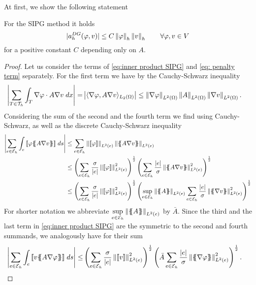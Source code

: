 At first, we show the following statement
\begin{lemma}\label{la: SIPG continuous}
	For the SIPG method it holds
	\[
	|a_h^{DG}(\varphi, v) | \leq C \left\lVert \varphi \right\rVert_{h} \left\lVert v \right\rVert_{h} \qquad \forall \varphi,v \in V
	\]
	for a positive constant $C$ depending only on $A$.
\end{lemma}
\begin{proof}
	Let us consider the terms of \eqref{eq:inner product SIPG} and \eqref{eq: penalty term} separately.
	For the first term we have by the Cauchy-Schwarz inequality
	\begin{align}
	\left| \sum\limits_{T \in \mathcal{T}_h} \int_{T} {{ \nabla \varphi \cdot A \nabla v}\;dx} \right|
	 =& \left|   \langle \nabla \varphi, A\nabla v \rangle _{L_2(\Omega)}  \right|
	  \leq \left\lVert \nabla \varphi \right\rVert_{L^2(\Omega)} \left\lVert A \right\rVert_{L^2(\Omega)} \left\lVert \nabla v \right\rVert_{L^2(\Omega)}. \label{eq: CS estimate 0}
	\end{align}
	Considering the sum of the second and the fourth term we find using Cauchy-Schwarz, as well as the discrete Cauchy-Schwarz inequality
	\begin{align}
	\singleNorm{\sum\limits_{e \in \edges}\myIntS e { \jump {\varphi \average{A \nabla v} }}} &\leq
	\sum\limits_{e \in \edges}  \LTwonormE{\jump {\varphi}} \LTwonormE {\average{A \nabla v}} \nonumber \\
	& \leq
	\left( \sum\limits_{e \in \edges} \frac {\sigma}{|e|} \LTwonormE{\jump {\varphi}}^2 \right)^{\frac 1 2}
	\left( \sum\limits_{e \in \edges} \frac {|e|} \sigma \LTwonormE{\average{A \nabla v}}^2 \right)^{\frac 1 2} 	 \nonumber \\
	& \leq
	\left( \sum\limits_{e \in \edges} \frac {\sigma}{|e|} \LTwonormE{\jump {\varphi}}^2 \right)^{\frac 1 2}
	 \left( \sup\limits_{e \in \edges} \LTwonormE{\average{A}}\sum\limits_{e \in \edges} \frac {|e|} \sigma \LTwonormE{\average{\nabla v}}^2 \right)^{\frac 1 2} \label{eq: CS estimate}
	\end{align}
	For shorter notation we abbreviate $\sup\limits_{e \in \mathcal{E}_h} \left\lVert \{\!\!\{ A \}\!\!\} \right\rVert_{L^2(e)}$ by $\bar A$. Since the third and the last term in \eqref{eq:inner product SIPG} are the symmetric to the second and fourth summands, we analogously have for their sum
	\begin{align}
	\singleNorm{\sum\limits_{e \in \edges}\myIntS e { \jump {v \average{A \nabla \varphi} }}} \leq&
	\left( \sum\limits_{e \in \edges} \frac {\sigma}{|e|}\LTwonormE{\jump {v}}^2 \right)^{\frac 1 2}
	\left( \bar A \sum\limits_{e \in \edges} \frac {|e|} \sigma \LTwonormE{\average{\nabla \varphi}}^2 \right)^{\frac 1 2}.\label{eq: CS estimate2}

\end{align}
\end{proof}
